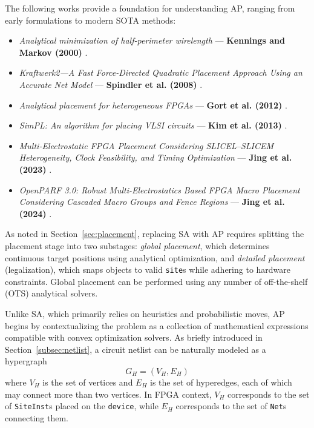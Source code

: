 The following works provide a foundation for understanding AP, ranging from early formulations to modern SOTA methods:
\begin{itemize}
    \item \emph{Analytical minimization of half-perimeter wirelength} — \textbf{Kennings and Markov (2000)} \cite{AP_2000}.
    \item \emph{Kraftwerk2—A Fast Force-Directed Quadratic Placement Approach Using an Accurate Net Model} — \textbf{Spindler et al. (2008)} \cite{kraftwerk2}.
    \item \emph{Analytical placement for heterogeneous FPGAs} — \textbf{Gort et al. (2012)} \cite{AP_2012}.
    \item \emph{SimPL: An algorithm for placing VLSI circuits} — \textbf{Kim et al. (2013)} \cite{SimPL}.
    \item \emph{Multi-Electrostatic FPGA Placement Considering SLICEL–SLICEM Heterogeneity, Clock Feasibility, and Timing Optimization} — \textbf{Jing et al. (2023)} \cite{MultiElectrostatic}.
    \item \emph{OpenPARF 3.0: Robust Multi-Electrostatics Based FPGA Macro Placement Considering Cascaded Macro Groups and Fence Regions} — \textbf{Jing et al. (2024)} \cite{OpenPARF}.
\end{itemize}

As noted in Section~\ref{sec:placement}, replacing SA with AP requires splitting the placement stage into two substages:  
\emph{global placement}, which determines continuous target positions using analytical optimization, and  
\emph{detailed placement} (legalization), which snaps objects to valid \texttt{site}s while adhering to hardware constraints.  
Global placement can be performed using any number of off-the-shelf (OTS) analytical solvers.

Unlike SA, which primarily relies on heuristics and probabilistic moves, AP begins by contextualizing the problem as a collection of mathematical expressions compatible with convex optimization solvers.
As briefly introduced in Section~\ref{subsec:netlist}, a circuit netlist can be naturally modeled as a hypergraph
\begin{equation}
    G_{H} = (V_{H}, E_{H})
    \label{equ:hypergraph}
\end{equation}
where \(V_{H}\) is the set of vertices and \(E_{H}\) is the set of hyperedges, each of which may connect more than two vertices. 
In FPGA context, \(V_{H}\) corresponds to the set of \texttt{SiteInst}s placed on the \texttt{device}, while \(E_{H}\) corresponds to the set of \texttt{Net}s connecting them.


